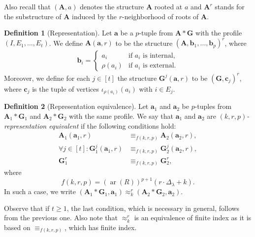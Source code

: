 \documentclass[11pt]{article}
\theoremstyle{plain}
\theoremstyle{definition}
\newtheorem{definition}{Definition}
\theoremstyle{remark}
\DeclareMathOperator\aritysym{ar}
\newcommand{\arity}[1]{{\aritysym({#1})}}
\newcommand{\str}[1]{\mathbf{#1}}
\newcommand{\maxarity}[1]{\Delta_{#1}}
\newcommand{\tpl}[1]{{\bm{#1}}}
\begin{document}
Also recall that $(\str{A},a)$ denotes the structure $\str{A}$ rooted at $a$ and $\str{A}^r$ stands for the substructure of $\str{A}$ induced by the $r$-neighborhood of roots of $\str{A}$.

\begin{definition}[Representation]
    Let $\tpl{a}$ be a $p$-tuple from $\str{A}*\str{G}$ with the profile $(I,E_1, \dots, E_t)$.
    We define $\str{A}(\tpl{a}, r)$ to be the structure $(\str{A}, \tpl{b}_1, \dots, \tpl{b}_p)^r$, where
    \begin{align*}
        \tpl{b}_i = 
        \begin{cases}
            a_i                         & \text{if $a_i$ is internal}
            , \\
            \rho(a_i) & \text{if $a_i$ is external}
            .
        \end{cases}
    \end{align*}
    Moreover, we define for each $j \in [t]$ the structure $\str{G}^j(\tpl{a}, r)$ to be $(\str{G}, \tpl{c}_j)^r$, where $\tpl{c}_j$ is the tuple of vertices $\iota_{\rho(a_i)}(a_i)$ with $i \in E_j$.
\end{definition}

\begin{definition}[Representation equivalence]
    Let $\tpl{a}_1$ and $\tpl{a}_2$ be $p$-tuples from $\str{A}_1*\str{G}_1$ and $\str{A}_2*\str{G}_2$ with the same profile.
    We say that $\tpl{a}_1$ and $\tpl{a}_2$ are \emph{$(k,r,p)$-representation equivalent} if the following conditions hold:
    \begin{align*}
        \str{A}_1(\tpl{a}_1, r) &\equiv_{f(k,r,p)} \str{A}_2(\tpl{a}_2, r)
        , \\
        \forall j \in [t] : \str{G}_1^j(\tpl{a}_1, r) &\equiv_{f(k,r,p)} \str{G}_2^j(\tpl{a}_2, r)
        , \\
        \str{G}_1^r &\equiv_{f(k,r,p)} \str{G}_2^r
        ,
    \end{align*}
    where
    \[
        f(k,r,p) = (\arity{R})^{p+1}(r \cdot \maxarity{\lambda} + k)
        .
    \]
    In such a case, we write $(\str{A}_1*\str{G}_1, \tpl{a}_1) \approx_k^r (\str{A}_2*\str{G}_2, \tpl{a}_2)$.
\end{definition}

Observe that if $t \geq 1$, the last condition, which is necessary in general, follows from the previous one.
Also note that $\approx_k^r$ is an equivalence of finite index as it is based on $\equiv_{f(k,r,p)}$, which has finite index.
\end{document}
